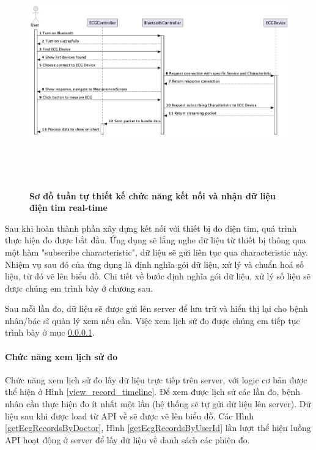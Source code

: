\begin{figure}[H]
  \centering
  \includegraphics[width=16cm,height=10cm]{Images/mobile_app/design_connect_and_receive_ECG_data.png}
  \caption[Sơ đồ tuần tự thiết kế chức năng kết nối và nhận dữ liệu điện tim real-time]{\bfseries \fontsize{12pt}{0pt}
  \selectfont Sơ đồ tuần tự thiết kế chức năng kết nối và nhận dữ liệu điện tim real-time}
  \label{seq_auth} %
\end{figure}

Sau khi hoàn thành phần xây dựng kết nối với thiết bị đo điện tim, quá trình thực hiện đo được bắt đầu. Ứng dụng sẽ lắng nghe
dữ liệu từ thiết bị thông qua một hàm "subscribe characteristic", dữ liệu sẽ gửi liên tục qua characteristic này. Nhiệm vụ sau đó của ứng dụng là
định nghĩa gói dữ liệu, xử lý và chuẩn hoá số liệu, từ đó vẽ lên biểu đồ. Chi tiết về bước định nghĩa gói dữ liệu, xử lý số liệu sẽ được chúng em trình bày
ở chương sau. 

Sau mỗi lần đo, dữ liệu sẽ được gửi lên server để lưu trữ và hiển thị lại cho bệnh nhân/bác sĩ quản lý xem nếu cần. Việc xem
lịch sử đo được chúng em tiếp tục trình bày ở mục \ref{function_view_history_record}.

\paragraph{Chức năng xem lịch sử đo}
\label{function_view_history_record}
\mbox{}

Chức năng xem lịch sử đo lấy dữ liệu trực tiếp trên server, với logic cơ bản được thể hiện ở Hình \ref{view_record_timeline}. 
Để xem được lịch sử các lần đo, bệnh nhân cần thực hiện đo ít nhất một lần (hệ thống sẽ tự gửi dữ liệu lên server). Dữ liệu sau khi được
load từ API về sẽ được vẽ lên biểu đồ. Các Hình \ref{getEcgRecordsByDoctor}, Hình \ref{getEcgRecordsByUserId}
lần lượt thể hiện luồng API hoạt động ở server để lấy dữ liệu về danh sách các phiên đo. 

